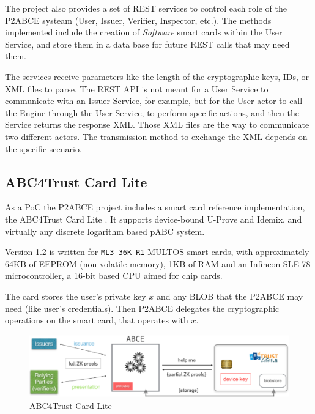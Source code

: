 \hfil

The project also provides a set of REST services to control each role of the P2ABCE systeam (User, Issuer, Verifier, Inspector, etc.). The methods implemented include the creation of \textit{Software} smart cards within the User Service, and store them in a data base for future REST calls that may need them.

The services receive parameters like the length of the cryptographic keys, IDs, or XML files to parse. The REST API is not meant for a User Service to communicate with an Issuer Service, for example, but for the User actor to call the Engine through the User Service, to perform specific actions, and then the Service returns the response XML. Those XML files are the way to communicate two different actors. The transmission method to exchange the XML depends on the specific scenario.



\subsection{ABC4Trust Card Lite}

As a PoC the P2ABCE project includes a smart card reference implementation, the ABC4Trust Card Lite \citep{ABC4TCardLite}. It supports device-bound U-Prove and Idemix, and virtually any discrete logarithm based pABC system.

Version 1.2 is written for \texttt{ML3-36K-R1} MULTOS smart cards, with approximately 64KB of EEPROM (non-volatile memory), 1KB of RAM and an Infineon SLE 78 microcontroller, a 16-bit based CPU aimed for chip cards.

The card stores the user's private key $x$ and any \ac{BLOB} that the P2ABCE may need (like user's credentials). Then P2ABCE delegates the cryptographic operations on the smart card, that operates with $x$.

\begin{figure}[bth]
	\begin{center}
		\includegraphics[width=\linewidth]{gfx/ABC4TCardLite}
	\end{center}
	\caption{ABC4Trust Card Lite}
	\label{fig:ABC4TCardLite}
\end{figure}

